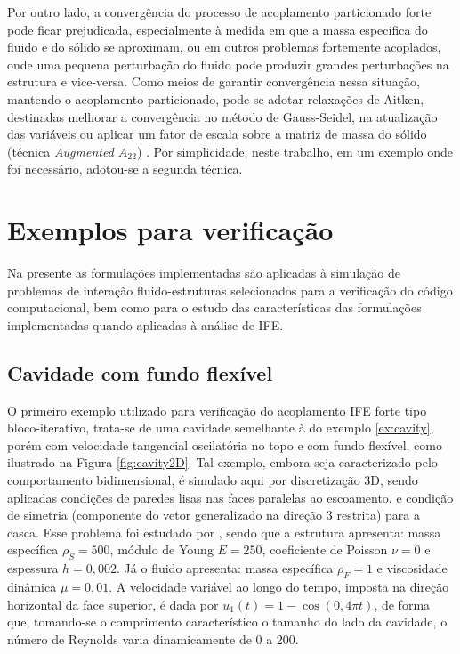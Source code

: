 Por outro lado, a convergência do processo de acoplamento particionado forte pode ficar prejudicada, especialmente à medida em que a massa específica do fluido e do sólido se aproximam, ou em outros problemas fortemente acoplados, onde uma pequena perturbação do fluido pode produzir grandes perturbações na estrutura e vice-versa. Como meios de garantir convergência nessa situação, mantendo o acoplamento particionado, pode-se adotar relaxações de Aitken, destinadas melhorar a convergência no método de Gauss-Seidel, na atualização das variáveis \cite{fernandes2019ale} ou aplicar um fator de escala sobre a matriz de massa do sólido (técnica \textit{Augmented $A_{22}$}) \cite{tezduyar2005finite}. Por simplicidade, neste trabalho, em um exemplo onde foi necessário, adotou-se a segunda técnica.

\section{Exemplos para verificação}

Na presente as formulações implementadas são aplicadas à simulação de problemas de interação fluido-estruturas selecionados para a verificação do código computacional, bem como para o estudo das características das formulações implementadas quando aplicadas à análise de IFE.

\subsection{Cavidade com fundo flexível} \label{FSI-Cavity2D}

O primeiro exemplo utilizado para verificação do acoplamento IFE forte tipo bloco-iterativo, trata-se de uma cavidade semelhante à do exemplo \ref{ex:cavity}, porém com velocidade tangencial oscilatória no topo e com fundo flexível, como ilustrado na Figura \ref{fig:cavity2D}. Tal exemplo, embora seja caracterizado pelo comportamento bidimensional, é simulado aqui por discretização 3D, sendo aplicadas condições de paredes lisas nas faces paralelas ao escoamento, e condição de simetria (componente do vetor generalizado na direção 3 restrita) para a casca. Esse problema foi estudado por , sendo que a estrutura apresenta: massa específica $\rho_S=500$, módulo de Young $E=250$, coeficiente de Poisson $\nu=0$ e espessura $h=0,002$. Já o fluido apresenta: massa específica $\rho_F=1$ e viscosidade dinâmica $\mu=0,01$. A velocidade variável ao longo do tempo, imposta na direção horizontal da face superior, é dada por $u_1(t)=1-\cos{(0,4\pi t)}$, de forma que, tomando-se o comprimento característico o tamanho do lado da cavidade, o número de Reynolds varia dinamicamente de 0 a 200.

